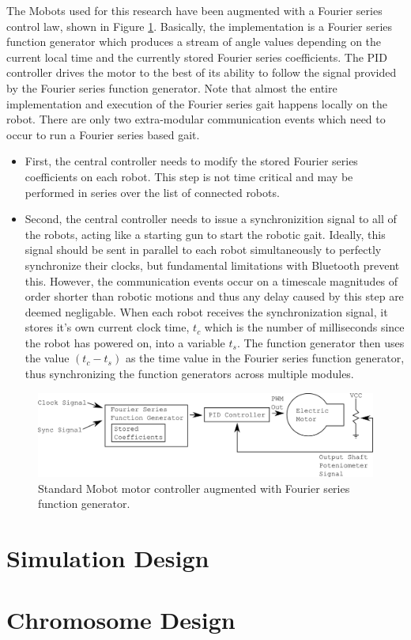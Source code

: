   The Mobots used for this research have been augmented with a Fourier series
    control law, shown in Figure \ref{fig:motor_controller_architecture}.
  Basically, the implementation is a Fourier series function generator which
    produces a stream of angle values depending on the current local time and the 
    currently stored Fourier series coefficients.
  The PID controller drives the motor to the best of its ability to follow 
    the signal provided by the Fourier series function generator.
  Note that almost the entire implementation and execution of the Fourier series
    gait happens locally on the robot.
  There are only two extra-modular communication events which need to occur to 
    run a Fourier series based gait.
    \begin{itemize}
      \item First, the central controller needs to modify the stored Fourier series 
        coefficients on each robot. This step is not time critical and may be 
        performed in series over the list of connected robots.
      \item Second, the central controller needs to issue a synchronizition
        signal to all of the robots, acting like a starting gun to start the
        robotic gait. Ideally, this signal should be sent in parallel to each
        robot simultaneously to perfectly synchronize their clocks, but 
        fundamental limitations with Bluetooth prevent this. However,
        the communication events occur on a timescale magnitudes of order
        shorter than robotic motions and thus any delay caused by this step
        are deemed negligable. When each robot receives the synchronization
        signal, it stores it's own current clock time, $t_c$ which is the
        number of milliseconds since the robot has powered on, into a 
        variable $t_s$. The function generator then uses the value
        $(t_c - t_s)$ as the time value in the Fourier series function generator,
        thus synchronizing the function generators across multiple modules.
    \end{itemize}
  
  \begin{figure}[!ht]
  \begin{center}
     \includegraphics[width=5in]{figures/motor_controller_architecture}
  \end{center}
  \caption{\label{fig:motor_controller_architecture}Standard Mobot
  motor controller augmented with Fourier series function generator.}
  \end{figure}

\section{Simulation Design}

\section{Chromosome Design}


